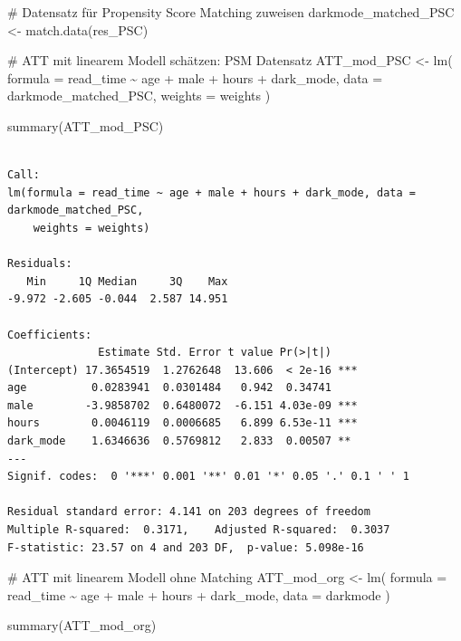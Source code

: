 \documentclass[
  a4paper,
  DIV=11,
  oneside]{scrreprt}
\newenvironment{Shaded}{\begin{snugshade}}{\end{snugshade}}
\newcommand{\AttributeTok}[1]{\textcolor[rgb]{0.40,0.45,0.13}{#1}}
\newcommand{\CommentTok}[1]{\textcolor[rgb]{0.37,0.37,0.37}{#1}}
\newcommand{\FunctionTok}[1]{\textcolor[rgb]{0.28,0.35,0.67}{#1}}
\newcommand{\NormalTok}[1]{\textcolor[rgb]{0.00,0.23,0.31}{#1}}
\newcommand{\OtherTok}[1]{\textcolor[rgb]{0.00,0.23,0.31}{#1}}
\newcommand{\SpecialCharTok}[1]{\textcolor[rgb]{0.37,0.37,0.37}{#1}}
\begin{document}
\begin{Shaded}
\begin{Highlighting}[]
\CommentTok{\# Datensatz für Propensity Score Matching zuweisen}
\NormalTok{darkmode\_matched\_PSC }\OtherTok{\textless{}{-}} \FunctionTok{match.data}\NormalTok{(res\_PSC)}

\CommentTok{\# ATT mit linearem Modell schätzen: PSM Datensatz}
\NormalTok{ATT\_mod\_PSC }\OtherTok{\textless{}{-}} \FunctionTok{lm}\NormalTok{(}
  \AttributeTok{formula =}\NormalTok{ read\_time }\SpecialCharTok{\textasciitilde{}}\NormalTok{ age }\SpecialCharTok{+}\NormalTok{ male }\SpecialCharTok{+}\NormalTok{ hours }\SpecialCharTok{+}\NormalTok{ dark\_mode,}
  \AttributeTok{data =}\NormalTok{ darkmode\_matched\_PSC, }
  \AttributeTok{weights =}\NormalTok{ weights }
\NormalTok{)}

\FunctionTok{summary}\NormalTok{(ATT\_mod\_PSC)}
\end{Highlighting}
\end{Shaded}

\begin{verbatim}

Call:
lm(formula = read_time ~ age + male + hours + dark_mode, data = darkmode_matched_PSC, 
    weights = weights)

Residuals:
   Min     1Q Median     3Q    Max 
-9.972 -2.605 -0.044  2.587 14.951 

Coefficients:
              Estimate Std. Error t value Pr(>|t|)    
(Intercept) 17.3654519  1.2762648  13.606  < 2e-16 ***
age          0.0283941  0.0301484   0.942  0.34741    
male        -3.9858702  0.6480072  -6.151 4.03e-09 ***
hours        0.0046119  0.0006685   6.899 6.53e-11 ***
dark_mode    1.6346636  0.5769812   2.833  0.00507 ** 
---
Signif. codes:  0 '***' 0.001 '**' 0.01 '*' 0.05 '.' 0.1 ' ' 1

Residual standard error: 4.141 on 203 degrees of freedom
Multiple R-squared:  0.3171,    Adjusted R-squared:  0.3037 
F-statistic: 23.57 on 4 and 203 DF,  p-value: 5.098e-16
\end{verbatim}

\begin{Shaded}
\begin{Highlighting}[]
\CommentTok{\# ATT mit linearem Modell ohne Matching}
\NormalTok{ATT\_mod\_org }\OtherTok{\textless{}{-}} \FunctionTok{lm}\NormalTok{(}
  \AttributeTok{formula =}\NormalTok{ read\_time }\SpecialCharTok{\textasciitilde{}}\NormalTok{ age }\SpecialCharTok{+}\NormalTok{ male }\SpecialCharTok{+}\NormalTok{ hours }\SpecialCharTok{+}\NormalTok{ dark\_mode,}
  \AttributeTok{data =}\NormalTok{ darkmode}
\NormalTok{)}

\FunctionTok{summary}\NormalTok{(ATT\_mod\_org)}
\end{Highlighting}
\end{Shaded}
\end{document}
